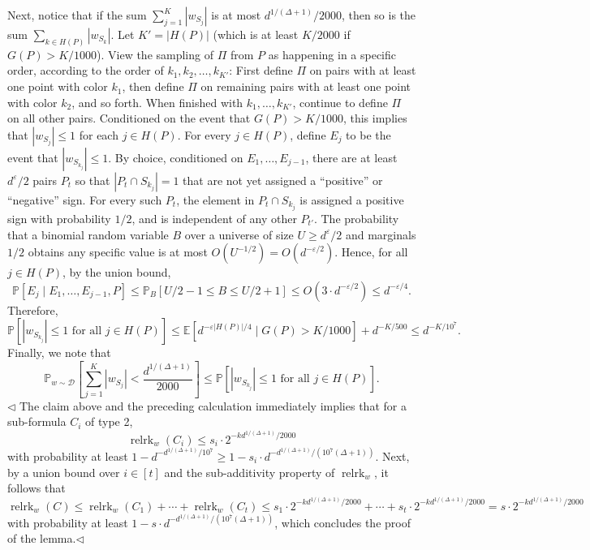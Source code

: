 \documentclass[10pt,a4paper]{article}
\begin{document}
Next, notice that if the sum $\sum_{j=1}^K|w_{S_j}|$ is at most $d^{1/(\Delta+1)}/2000$, then so is the sum $\sum_{k\in H(P)}|w_{S_k}|$. Let $K'=|H(P)|$ (which is at least $K/2000$ if $G(P)>K/1000$). View the sampling of $\Pi$ from $P$ as happening in a specific order, according to the order of $k_1,k_2,\ldots,k_{K'}$: First define $\Pi$ on pairs with at least one point with color $k_1$, then define $\Pi$ on remaining pairs with at least one point with color $k_2$, and so forth. When finished with $k_1,\ldots,k_{K'}$, continue to define $\Pi$ on all other pairs.
Conditioned on the event that $G(P)>K/1000$, this implies that $|w_{S_j}|\leq1$ for each $j\in H(P)$. For every $j\in H(P)$, define $E_j$ to be the event that $|w_{S_{k_j}}|\leq1$. By choice, conditioned on $E_1,\ldots,E_{j-1}$, there are at least $d^\varepsilon/2$ pairs $P_t$ so that $|P_t\cap S_{k_j}|=1$ that are not yet assigned a ``positive'' or ``negative'' sign. For every such $P_t$, the element in $P_t\cap S_{k_j}$ is assigned a positive sign with probability $1/2$, and is independent of any other $P_{t'}$. The probability that a binomial random variable $B$ over a universe of size $U\geq d^\varepsilon/2$ and marginals $1/2$ obtains any specific value is at most $O(U^{-1/2})=O(d^{-\varepsilon/2})$. Hence, for all $j\in H(P)$, by the union bound,
\[\mathbb P[E_j\mid E_1,\ldots,E_{j-1},P]\leq\mathbb P_B[U/2-1\leq B\leq U/2+1]\leq O(3\cdot d^{-\varepsilon/2})\leq d^{-\varepsilon/4}.\]
Therefore,
\[\mathbb P[|w_{S_{k_j}}|\leq1\text{ for all }j\in H(P)]\leq\mathbb E[d^{-\varepsilon|H(P)|/4}\mid G(P)>K/1000]+d^{-K/500}\leq d^{-K/10^7}.\]
Finally, we note that
\[\mathbb P_{w\sim\mathcal D}\left[\sum_{j=1}^K|w_{S_j}|<\frac{d^{1/(\Delta+1)}}{2000}\right]\leq\mathbb P[|w_{S_{k_j}}|\leq1\text{ for all }j\in H(P)].\]\hfill$\triangleleft$
The claim above and the preceding calculation immediately implies that for a sub-formula $C_i$ of type 2,
\[\operatorname{relrk}_w(C_i)\leq s_i\cdot2^{-kd^{1/(\Delta+1)}/2000}\]
with probability at least $1-d^{-d^{1/(\Delta+1)}/10^7}\geq1-s_i\cdot d^{-d^{1/(\Delta+1)}/(10^7(\Delta+1))}$.
Next, by a union bound over $i\in[t]$ and the sub-additivity property of $\operatorname{relrk}_w$, it follows that
\[\operatorname{relrk}_w(C)\leq\operatorname{relrk}_w(C_1)+\cdots+\operatorname{relrk}_w(C_t)\leq s_1\cdot2^{-kd^{1/(\Delta+1)}/2000}+\cdots+s_t\cdot2^{-kd^{1/(\Delta+1)}/2000}=s\cdot2^{-kd^{1/(\Delta+1)}/2000}\]
with probability at least $1-s\cdot d^{-d^{1/(\Delta+1)}/(10^7(\Delta+1))}$, which concludes the proof of the lemma.\hfill$\triangleleft$
\end{document}

